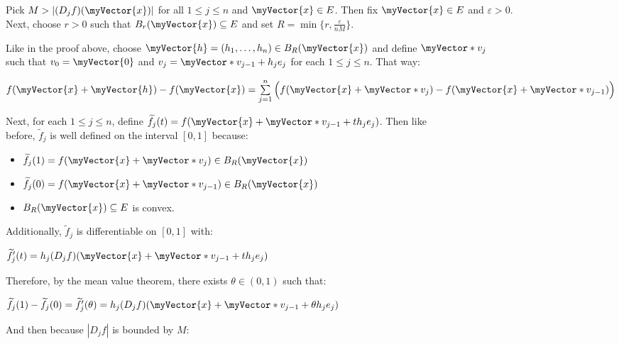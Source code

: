 \documentclass{book}
\newcommand{\exTwo}{%
   \color{RedViolet}%
   \fontsize{13}{15}\selectfont%
}
\newenvironment{myIndent}{%
   \begin{adjustwidth}{2.5em}{0em}%
}{%
   \end{adjustwidth}%
}
\newcommand{\retTwo}{\hfill\bigbreak}
\newcommand{\myVS}{\vphantom{\ensuremath{\int_a^b}}}
\newcommand{\mVec}[1]{\myVector{#1}}
\newcommand{\mVecAst}[1]{\myVector*{#1}}
\begin{document}
{\begin{myIndent}\exTwo
   Pick $M > |(D_jf)(\mVec{x})|$ for all $1 \leq j \leq n$ and $\mVec{x} \in E$. Then fix $\mVec{x} \in E$ and $\varepsilon > 0$.\\ [1pt]
   Next, choose $r > 0$ such that $B_r(\mVec{x}) \subseteq E$ and set $R = \min\{r, \frac{\varepsilon}{nM}\}$.\retTwo
   
   Like in the proof above, choose $\mVec{h} = (h_1, \ldots, h_n) \in B_R(\mVec{x})$ and define $\mVecAst{v}_j$\\ [-2pt] such that $v_0 = \mVec{0}$ and $v_j = \mVecAst{v}_{j-1} + h_je_j$ for each $1 \leq j \leq n$. That way:
   \begin{center}
      {\fontsize{12}{14}\selectfont
         $f(\mVec{x} + \mVec{h}) - f(\mVec{x}) = \sum\limits_{j=1}^n\left(\myVS f(\mVec{x} + \mVecAst{v}_j) - f(\mVec{x} + \mVecAst{v}_{j-1})\right)$}
   \end{center}

   \newpage

   Next, for each $1 \leq j \leq n$, define $\widetilde{f}_j(t) = f(\mVec{x} + \mVecAst{v}_{j-1} + th_je_j)$. Then like\\ before, $\widetilde{f}_j$ is well defined on the interval $[0, 1]$ because:
   \begin{itemize}
      \item $\widetilde{f}_j(1) = f(\mVec{x} + \mVecAst{v}_j) \in B_R(\mVec{x})$
      \item $\widetilde{f}_j(0) = f(\mVec{x} + \mVecAst{v}_{j-1}) \in B_R(\mVec{x})$
      \item $B_R(\mVec{x}) \subseteq E$ is convex.
   \end{itemize}\retTwo

   Additionally, $\widetilde{f}_j$ is differentiable on $[0, 1]$ with:
   
   {\center$\widetilde{f}_j^\prime(t) = h_j(D_jf)(\mVec{x} + \mVecAst{v}_{j-1} + th_je_j)$\retTwo\par}
   
   Therefore, by the mean value theorem, there exists $\theta \in (0, 1)$ such that:
   
   {\center $\widetilde{f}_j(1) - \widetilde{f}_j(0) = \widetilde{f}_j^\prime(\theta) = h_j(D_jf)(\mVec{x} + \mVecAst{v}_{j-1} + \theta h_je_j)$\retTwo\par}

   And then because $|D_jf|$ is bounded by $M$:

   {\center{\fontsize{12}{14}\selectfont
   \begin{tabular}{l}
      $|f(\mVec{x} + \mVecAst{v}_j) - f(\mVec{x} + \mVecAst{v}_{j-1})| = |\widetilde{f}_j(1) - \widetilde{f}_j(0)|$ \\[2pt]


\end{tabular}}}
\end{myIndent}}
\end{document}
